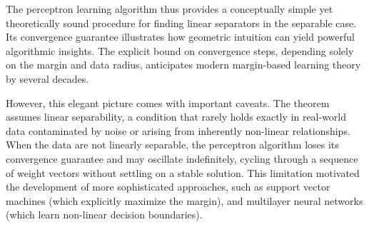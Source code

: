 The perceptron learning algorithm thus provides a conceptually simple yet theoretically sound procedure for finding linear separators in the separable case. Its convergence guarantee illustrates how geometric intuition can yield powerful algorithmic insights. The explicit bound on convergence steps, depending solely on the margin and data radius, anticipates modern margin-based learning theory by several decades.

However, this elegant picture comes with important caveats. The theorem assumes linear separability, a condition that rarely holds exactly in real-world data contaminated by noise or arising from inherently non-linear relationships. When the data are not linearly separable, the perceptron algorithm loses its convergence guarantee and may oscillate indefinitely, cycling through a sequence of weight vectors without settling on a stable solution. This limitation motivated the development of more sophisticated approaches, such as support vector machines (which explicitly maximize the margin), and multilayer neural networks (which learn non-linear decision boundaries). 




%